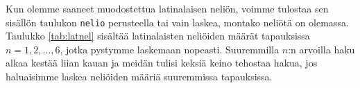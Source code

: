 Kun olemme saaneet muodostettua latinalaisen neliön, voimme
tulostaa sen sisällön taulukon \texttt{nelio} perusteella
tai vain laskea, montako neliötä on olemassa.
Taulukko \ref{tab:latnel} sisältää latinalaisten neliöiden
määrät tapauksissa $n=1,2,\dots,6$, jotka pystymme laskemaan nopeasti.
Suuremmilla $n$:n arvoilla haku alkaa kestää liian kauan
ja meidän tulisi keksiä keino tehostaa hakua,
jos haluaisimme laskea neliöiden määriä suuremmissa tapauksissa.
